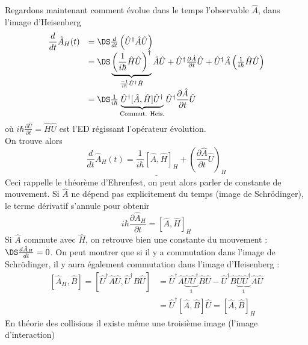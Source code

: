  
Regardons maintenant comment évolue dans le temps l'observable $\hat{A}$, dans l'image 
d'Heisenberg
\begin{equation}
\begin{array}{ll}
\dfrac{d}{dt}\hat{A}_H(t) &= \DS \frac{d}{dt}\left(\hat{U}^\dagger \hat A \hat U\right)\\
&= \DS \underbrace{\left(\frac{1}{i\hbar}\hat{H}\hat{U}\right)^\dagger}_{\frac{-1}{i\hbar}\hat{U}^\dagger 
\hat{H}} \hat{A}\hat{U}+\hat{U}^\dagger 
\frac{\partial \hat{A}}{\partial t}\hat{U}+\hat{U}^\dagger\hat{A}\left(\frac{1}{i\hbar}\hat{H}
\hat{U}\right)\\
&=\DS \frac{1}{i\hbar}\underbrace{\hat{U}^\dagger[\hat{A},\hat{H}]\hat{U}^\dagger}_{\text{Commut. 
Heis.}} \hat{U}^\dagger \dfrac{\partial\hat{A}}{\partial t}\hat{U}
\end{array}
\end{equation}
où $i\hbar\frac{\partial \hat{U}}{\partial t} = \hat{H}\hat{U}$ est l'ED régissant l'opérateur 
évolution.\\
On trouve alors
\begin{equation}
\underline{\dfrac{d}{dt}\hat{A}_H(t) = \dfrac{1}{i\hbar}[\hat{A},\hat{H}]_H + \left(\dfrac{\partial\hat{A}}{\partial 
t}\hat{U}\right)_H}
\end{equation}
Ceci rappelle le théorème d'Ehrenfest, on peut alors parler de constante de mouvement. Si $\hat{A}$ 
ne dépend pas explicitement du temps (image de Schrödinger), le terme dérivatif s'annule pour obtenir
\begin{equation}
i\hbar \dfrac{\partial \hat{A}_H}{\partial t} = [\hat{A},\hat{H}]_H
\end{equation}
Si $\hat{A}$ commute avec $\hat{H}$, on retrouve bien une constante du mouvement : $\DS \frac{d\hat{A}_H}{
dt}=0$. On peut montrer que si il y a commutation dans l'image de Schrödinger, il y aura également 
commutation dans l'image d'Heisenberg :
\begin{equation}
\begin{array}{ll}
[\hat{A}_H,\hat{B}] = [\hat{U}^\dagger\hat{A}\hat{U},\hat{U}^\dagger B\hat{U}] &= \hat{U}^\dagger\hat{A}
\underbrace{\hat{U}\hat{U}^\dagger}_{\mathbb{1}}\hat{B}\hat{U}-\hat{U}^\dagger\hat{B}\underbrace{\hat{U}
\hat{U}^\dagger}_{\mathbb{1}}\hat{A}\hat{U}\\
&= \hat{U}^\dagger[\hat{A},\hat{B}]\hat{U} = [\hat{A},\hat{B}]_H
\end{array}
\end{equation}
En théorie  des collisions il existe même une troisième image (l'image d'interaction) 
